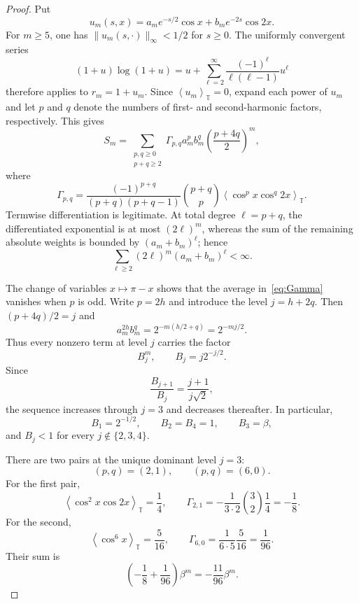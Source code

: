 \documentclass[10pt,letterpaper,journal]{IEEEtran}
\newcommand{\T}{\mathbb{T}}
\newcommand{\avgT}[1]{\left\langle #1\right\rangle_{\T}}
\theoremstyle{plain}
\theoremstyle{definition}
\begin{document}
\begin{proof}
Put
\[
 u_m(s,x)=a_me^{-s/2}\cos x+b_me^{-2s}\cos2x.
\]
For $m\ge5$, one has $\lVert u_m(s,\cdot)\rVert_\infty<1/2$ for $s\ge0$.
The uniformly convergent series
\begin{equation}
 (1+u)\log(1+u)
 =u+\sum_{\ell=2}^{\infty}
 \frac{(-1)^\ell}{\ell(\ell-1)}u^\ell
 \label{eq:entropy-series}
\end{equation}
therefore applies to $r_m=1+u_m$. Since $\avgT{u_m}=0$, expand each power of
$u_m$ and let $p$ and $q$ denote the numbers of first- and second-harmonic
factors, respectively. This gives
\begin{equation}
 S_m=\sum_{\substack{p,q\ge0\\p+q\ge2}}
 \Gamma_{p,q}a_m^pb_m^q
 \left(\frac{p+4q}{2}\right)^m,
 \label{eq:Sm-exact}
\end{equation}
where
\begin{equation}
 \Gamma_{p,q}=
 \frac{(-1)^{p+q}}{(p+q)(p+q-1)}
 \binom{p+q}{p}
 \avgT{\cos^p x\cos^q2x}.
 \label{eq:Gamma}
\end{equation}
Termwise differentiation is legitimate. At total degree
$\ell=p+q$, the differentiated exponential is at most $(2\ell)^m$,
whereas the sum of the remaining absolute weights is bounded by
$(a_m+b_m)^\ell$; hence
\[
 \sum_{\ell\ge2}(2\ell)^m(a_m+b_m)^\ell<\infty.
\]

The change of variables $x\mapsto\pi-x$ shows that the average
in~\eqref{eq:Gamma} vanishes when $p$ is odd. Write $p=2h$ and introduce
the level $j=h+2q$. Then $(p+4q)/2=j$ and
\[
 a_m^{2h}b_m^q=2^{-m(h/2+q)}=2^{-mj/2}.
\]
Thus every nonzero term at level $j$ carries the factor
\begin{equation}
 B_j^m,\qquad B_j=j2^{-j/2}.
 \label{eq:spectral-gain}
\end{equation}
Since
\[
 \frac{B_{j+1}}{B_j}=\frac{j+1}{j\sqrt2},
\]
the sequence increases through $j=3$ and decreases thereafter. In
particular,
\[
 B_1=2^{-1/2},\qquad B_2=B_4=1,
 \qquad B_3=\beta,
\]
and $B_j<1$ for every $j\notin\{2,3,4\}$.

There are two pairs at the unique dominant level $j=3$:
\[
 (p,q)=(2,1),\qquad (p,q)=(6,0).
\]
For the first pair,
\[
 \avgT{\cos^2x\cos2x}=\frac14,
 \qquad
 \Gamma_{2,1}=-\frac1{3\cdot2}\binom32\frac14=-\frac18.
\]
For the second,
\[
 \avgT{\cos^6x}=\frac5{16},
 \qquad
 \Gamma_{6,0}=\frac1{6\cdot5}\frac5{16}=\frac1{96}.
\]
Their sum is
\begin{equation}
 \left(-\frac18+\frac1{96}\right)\beta^m
 =-\frac{11}{96}\beta^m.
 \label{eq:dominant-level}
\end{equation}


\end{proof}
\end{document}
